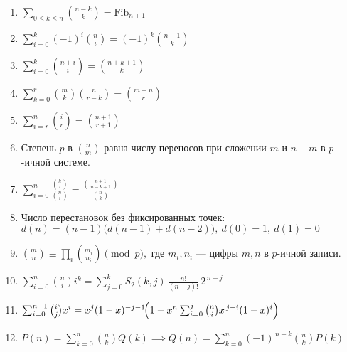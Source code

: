 
\begingroup
\small

\begin{enumerate}
\item %
$\sum_{0\le k\le n}\binom{n-k}{k}=\mathrm{Fib}_{n+1}$

\item %
$\sum_{i=0}^{k}(-1)^i\binom{n}{i}=(-1)^k\binom{n-1}{k}$

\item %
$\sum_{i=0}^{k}\binom{n+i}{i}=\binom{n+k+1}{k}$

\item %
$\sum_{k=0}^{r}\binom{m}{k}\binom{n}{r-k}=\binom{m+n}{r}$

\item %
$\sum_{i=r}^{n}\binom{i}{r}=\binom{n+1}{r+1}$

\item %
Степень $p$ в $\binom{n}{m}$ равна числу переносов при сложении $m$ и $n-m$ в $p$-ичной системе.

\item %
$\sum_{i=0}^{n}\frac{\binom{k}{i}}{\binom{n}{i}}
=\frac{\binom{n+1}{\,n-k+1\,}}{\binom{n}{k}}$

\item %
Число перестановок без фиксированных точек: \\ $d(n)=(n-1)\bigl(d(n-1)+d(n-2)\bigr),\  d(0)=1,\ d(1)=0$

\item %
$\binom{m}{n}\equiv\prod_i\binom{m_i}{n_i}\pmod p,$
\quad где $m_i,n_i$ — цифры $m,n$ в $p$-ичной записи.

\item %
$\sum_{i=0}^{n}\binom{n}{i}i^k
=\sum_{j=0}^{k}S_2(k,j)\,\frac{n!}{(n-j)!}\,2^{\,n-j}$

\item %
$\sum_{i=0}^{n-1}\binom{i}{j}x^i
= x^j(1-x)^{-j-1}\!\Bigl(1-x^n\sum_{i=0}^j\binom{n}{i}x^{\,j-i}(1-x)^i\Bigr)$

\item %
$P(n)=\sum_{k=0}^{n}\binom{n}{k}Q(k) \implies Q(n)=\sum_{k=0}^{n}(-1)^{\,n-k}\binom{n}{k}P(k)$


\end{enumerate}
